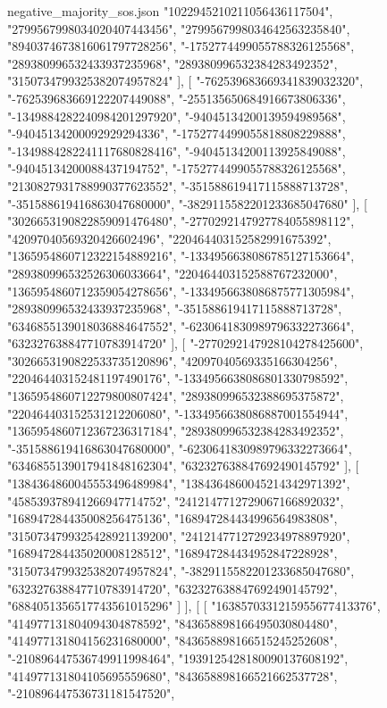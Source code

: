 \begin{filecontents*}[overwrite]{negative_majority_sos.json}
    "1022945210211056436117504",
    "2799567998034020407443456",
    "2799567998034642563235840",
    "8940374673816061797728256",
    "-1752774499055788326125568",
    "289380996532433937235968",
    "289380996532384283492352",
    "3150734799325382074957824"
   ],
   [
    "-762539683669341839032320",
    "-762539683669122207449088",
    "-255135650684916673806336",
    "-1349884282240984201297920",
    "-94045134200139594989568",
    "-94045134200092929294336",
    "-1752774499055818808229888",
    "-1349884282241117680828416",
    "-94045134200113925849088",
    "-94045134200088437194752",
    "-1752774499055788326125568",
    "2130827931788990377623552",
    "-351588619417115888713728",
    "-351588619416863047680000",
    "-3829115582201233685047680"
   ],
   [
    "3026653190822859091476480",
    "-2770292147927784055898112",
    "42097040569320426602496",
    "220464403152582991675392",
    "1365954860712322154889216",
    "-1334956638086785127153664",
    "289380996532526306033664",
    "220464403152588767232000",
    "1365954860712359054278656",
    "-1334956638086875771305984",
    "289380996532433937235968",
    "-351588619417115888713728",
    "6346855139018036884647552",
    "-6230641830989796332273664",
    "632327638847710783914720"
   ],
   [
    "-2770292147928104278425600",
    "3026653190822533735120896",
    "42097040569335166304256",
    "220464403152481197490176",
    "-1334956638086801330798592",
    "1365954860712279800807424",
    "289380996532388695375872",
    "220464403152531212206080",
    "-1334956638086887001554944",
    "1365954860712367236317184",
    "289380996532384283492352",
    "-351588619416863047680000",
    "-6230641830989796332273664",
    "6346855139017941848162304",
    "632327638847692490145792"
   ],
   [
    "1384364860045553496489984",
    "1384364860045214342971392",
    "458539378941266947714752",
    "2412147712729067166892032",
    "168947284435008256475136",
    "168947284434996564983808",
    "3150734799325428921139200",
    "2412147712729234978897920",
    "168947284435020008128512",
    "168947284434952847228928",
    "3150734799325382074957824",
    "-3829115582201233685047680",
    "632327638847710783914720",
    "632327638847692490145792",
    "6884051356517743561015296"
   ]
  ],
  [
   [
    "1638570331215955677413376",
    "414977131804094304878592",
    "843658898166495030804480",
    "414977131804156231680000",
    "843658898166515245252608",
    "-210896447536749911998464",
    "1939125428180090137608192",
    "414977131804105695559680",
    "843658898166521662537728",
    "-210896447536731181547520",

\end{filecontents*}
